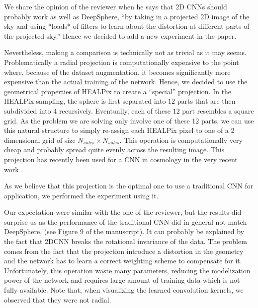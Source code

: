 \documentclass[12pt,a4paper]{article}
\newcommand{\nati}[1]{{\color[rgb]{.1,.6,.1}{NP: #1}}}
\newcommand{\TK}[1]{{\color{red}{TK: #1}}}
\newcommand{\todo}[1]{{\color[rgb]{.6,.1,.6}{TODO: #1}}}
\newcommand{\1}{\b{1}}              %
\newcommand{\0}{\b{0}}              %
\begin{document}
\todo{Assigned: @Nati, @Michael, @Tomek}
\nati{Please check if you like what I did in light of the discussion we had.}

We share the opinion of the reviewer when he says that 2D CNNs should probably work as well as DeepSphere, ``by taking in a projected 2D image of the sky and using *loads* of filters to learn about the distortion at different parts of the projected sky.'' Hence we decided to add a new experiment in the paper.

Nevertheless, making a comparison is technically not as trivial as it may seems.
Problematically a radial projection is computationally expensive to the point where, because of the dataset augmentation, it becomes significantly more expensive than the actual training of the network.
Hence, we decided to use the geometrical properties of HEALPix to create a ``special'' projection.
In the HEALPix sampling, the sphere is first separated into $12$ parts that are then subdivided into $4$ recursively.
Eventually, each of these $12$ part resembles a square grid.
As the problem we are solving only involve one of these 12 parts, we can use this natural structure to simply re-assign each HEALPix pixel to one of a 2 dimensional grid of size $N_{sides} \times N_{sides}$.
This operation is computationally very cheap and probably spread quite evenly across the resulting image.
This projection has recently been used for a CNN in cosmology in the very recent work \cite{krachmalnicoff2019convolutional}.

As we believe that this projection is the optimal one to use a traditional CNN for application, we performed the experiment using it.


Our expectation were similar with the one of the reviewer, but the results did surprise us as the performance of the traditional CNN did in general not match DeepSphere, (see Figure 9 of the manuscript).
It can probably be explained by the fact that 2DCNN breaks the rotational invariance of the data.
The problem comes from the fact that the projection introduce a distortion in the geometry and the network has to learn a correct weighting scheme to compensate for it.
Unfortunately, this operation waste many parameters, reducing the modelization power of the network and requires large amount of training data which is not fully available.
Note that, when visualizing the learned convolution kernels, we observed that they were not radial.



\end{document}

